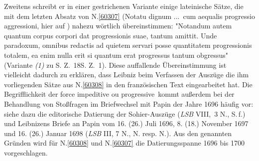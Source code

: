 \begin{ledgroup}
Zweitens schreibt er in einer gestrichenen Variante einige lateinische Sätze, die mit dem letzten Absatz von N.\;\ref{60307} (\glqq Notatu dignum \lbrack...\rbrack\ cum aequalis progressio aggressioni\grqq, hier auf ) nahezu wörtlich übereinstimmen: 
"Notandum autem quantum corpus corpori dat progressionis suae, tantum amittit. 
Unde paradoxum, omnibus redactis ad quietem servari posse quantitatem progressionis totalem, 
ea enim nulla erit si quantum erat progressus tantum obgressus"
(Variante \textit{(1)} zu S. Z.~18\textendash S. Z.~1).
Diese auffallende Übereinstimmung ist vielleicht dadurch zu erklären, dass Leibniz beim Verfassen der Auszüge die ihm vorliegenden Sätze aus N.\;\ref{60308} in den französischen Text eingearbeitet hat.
\pend
\pstart
Die Begrifflichkeit der \glqq force impeditive ou progressive\grqq\ kommt außerdem 
bei der Behandlung von Stoßfragen im Briefwechsel mit Papin der Jahre 1696 häufig vor: 
siehe dazu die editorische Datierung der Sohier-Auszüge (\textit{LSB} VIII,~3 N., S.\,f.) und Leibnizens Briefe an Papin
\cite{02071}vom 16. (26.) Juli 1696, 
\cite{01503}8. (18.) November 1697 und 
\cite{02073}16. (26.) Januar 1698
(\textit{LSB} III, 7 N., N. resp. N.).
Aus den genannten Gründen wird für N.\;\ref{60308} und N.\;\ref{60307}
die Datierungsspanne 1696 bis 1700 vorgeschlagen.
\pend 
\end{ledgroup}
